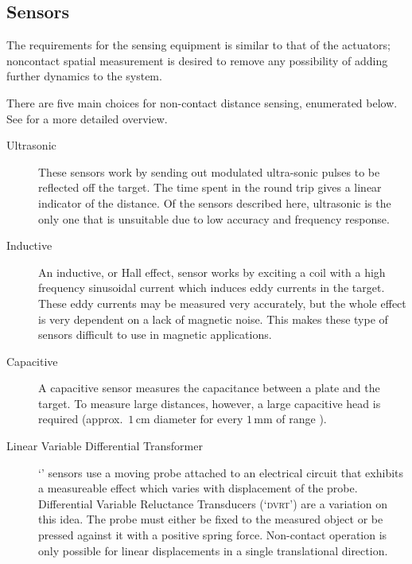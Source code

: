 \subsection{Sensors}

The requirements for the sensing equipment is similar to that
of the actuators; noncontact spatial measurement is desired
to remove any possibility of adding further dynamics to the system.

There are five main choices for non-contact distance sensing,
enumerated below. See \textcite{boehm1993} for a more detailed overview.
\begin{description}

\item[Ultrasonic]

    These sensors work by sending out modulated
    ultra-sonic pulses to be reflected off the target. The time spent
    in the round trip gives a linear indicator of the
    distance. Of the sensors described here, ultrasonic is the only one
    that is unsuitable due to low accuracy and frequency response.

\item[Inductive]

    An inductive, or Hall effect, sensor works by exciting a coil with a high
    frequency sinusoidal current which induces eddy currents in the target.
    These eddy currents may be measured very accurately, but the whole effect
    is very dependent on a lack of magnetic noise. This makes these type of
    sensors difficult to use in magnetic applications.

\item[Capacitive]

    A capacitive sensor measures the capacitance between a plate and the
    target. 
    To measure large distances, however, a large capacitive head is
    required (approx.\ $1$\,cm diameter for every $1$\,mm of range
    ).

\item[Linear Variable Differential Transformer]

    `' sensors use a moving probe attached to an electrical
    circuit that exhibits a measureable effect which varies with displacement
    of the probe. 
    Differential Variable Reluctance Transducers
    (`\textsc{dvrt}') are a variation on this idea. The probe must either be
    fixed to the measured object or be pressed against it with a positive
    spring force. Non-contact operation is only possible for linear
    displacements in a single translational direction.


\end{description}
